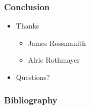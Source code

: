 \documentclass[10pt]{beamer}
\begin{document}
    \begin{frame}
      \frametitle{Conclusion}
      \begin{itemize}
        \item Thanks
          \begin{itemize}
            \item James Rossmanith
            \item Alric Rothmayer
          \end{itemize}
        \item Questions?
      \end{itemize}
    \end{frame}

    \begin{frame}
      \frametitle{Bibliography}
      \nocite{*}
      \printbibliography{}
    \end{frame}
\end{document}
